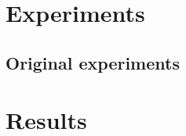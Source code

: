 \documentclass[runningheads]{llncs}
\begin{document}

\section{Experiments}



\subsection{Original experiments}


\section{Results}



\end{document}
